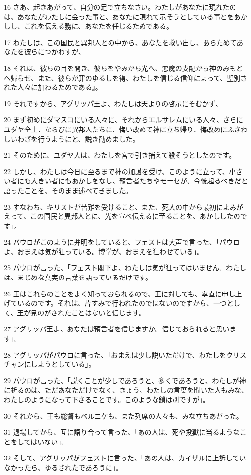 \par 16 さあ、起きあがって、自分の足で立ちなさい。わたしがあなたに現れたのは、あなたがわたしに会った事と、あなたに現れて示そうとしている事とをあかしし、これを伝える務に、あなたを任じるためである。
\par 17 わたしは、この国民と異邦人との中から、あなたを救い出し、あらためてあなたを彼らにつかわすが、
\par 18 それは、彼らの目を開き、彼らをやみから光へ、悪魔の支配から神のみもとへ帰らせ、また、彼らが罪のゆるしを得、わたしを信じる信仰によって、聖別された人々に加わるためである』。
\par 19 それですから、アグリッパ王よ、わたしは天よりの啓示にそむかず、
\par 20 まず初めにダマスコにいる人々に、それからエルサレムにいる人々、さらにユダヤ全土、ならびに異邦人たちに、悔い改めて神に立ち帰り、悔改めにふさわしいわざを行うようにと、説き勧めました。
\par 21 そのために、ユダヤ人は、わたしを宮で引き捕えて殺そうとしたのです。
\par 22 しかし、わたしは今日に至るまで神の加護を受け、このように立って、小さい者にも大きい者にもあかしをなし、預言者たちやモーセが、今後起るべきだと語ったことを、そのまま述べてきました。
\par 23 すなわち、キリストが苦難を受けること、また、死人の中から最初によみがえって、この国民と異邦人とに、光を宣べ伝えるに至ることを、あかししたのです」。
\par 24 パウロがこのように弁明をしていると、フェストは大声で言った、「パウロよ、おまえは気が狂っている。博学が、おまえを狂わせている」。
\par 25 パウロが言った、「フェスト閣下よ、わたしは気が狂ってはいません。わたしは、まじめな真実の言葉を語っているだけです。
\par 26 王はこれらのことをよく知っておられるので、王に対しても、率直に申し上げているのです。それは、片すみで行われたのではないのですから、一つとして、王が見のがされたことはないと信じます。
\par 27 アグリッパ王よ、あなたは預言者を信じますか。信じておられると思います」。
\par 28 アグリッパがパウロに言った、「おまえは少し説いただけで、わたしをクリスチャンにしようとしている」。
\par 29 パウロが言った、「説くことが少しであろうと、多くであろうと、わたしが神に祈るのは、ただあなただけでなく、きょう、わたしの言葉を聞いた人もみな、わたしのようになって下さることです。このような鎖は別ですが」。
\par 30 それから、王も総督もベルニケも、また列席の人々も、みな立ちあがった。
\par 31 退場してから、互に語り合って言った、「あの人は、死や投獄に当るようなことをしてはいない」。
\par 32 そして、アグリッパがフェストに言った、「あの人は、カイザルに上訴していなかったら、ゆるされたであろうに」。

